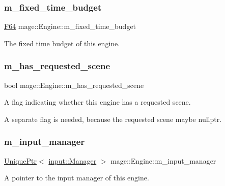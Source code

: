 \subsubsection{\texorpdfstring{m\+\_\+fixed\+\_\+time\+\_\+budget}{m\_fixed\_time\_budget}}
{\footnotesize\ttfamily \hyperlink{namespacemage_ad26233bbec640deda836e572c1a23708}{F64} mage\+::\+Engine\+::m\+\_\+fixed\+\_\+time\+\_\+budget\hspace{0.3cm}{\ttfamily [private]}}

The fixed time budget of this engine. \hypertarget{classmage_1_1_engine_a96089c745442208679ea2e18cc6a6097}{}\label{classmage_1_1_engine_a96089c745442208679ea2e18cc6a6097} 
\subsubsection{\texorpdfstring{m\+\_\+has\+\_\+requested\+\_\+scene}{m\_has\_requested\_scene}}
{\footnotesize\ttfamily bool mage\+::\+Engine\+::m\+\_\+has\+\_\+requested\+\_\+scene\hspace{0.3cm}{\ttfamily [private]}}

A flag indicating whether this engine has a requested scene.

A separate flag is needed, because the requested scene maybe {\ttfamily nullptr}. \hypertarget{classmage_1_1_engine_a33db04e6d27802054769ff6a30911261}{}\label{classmage_1_1_engine_a33db04e6d27802054769ff6a30911261} 
\subsubsection{\texorpdfstring{m\+\_\+input\+\_\+manager}{m\_input\_manager}}
{\footnotesize\ttfamily \hyperlink{namespacemage_a3316d7143a973e37adf1110f2e80ca31}{Unique\+Ptr}$<$ \hyperlink{classmage_1_1input_1_1_manager}{input\+::\+Manager} $>$ mage\+::\+Engine\+::m\+\_\+input\+\_\+manager\hspace{0.3cm}{\ttfamily [private]}}

A pointer to the input manager of this engine. \hypertarget{classmage_1_1_engine_a8359f22543fa6e39c948411e3023c397}{}\label{classmage_1_1_engine_a8359f22543fa6e39c948411e3023c397} 
